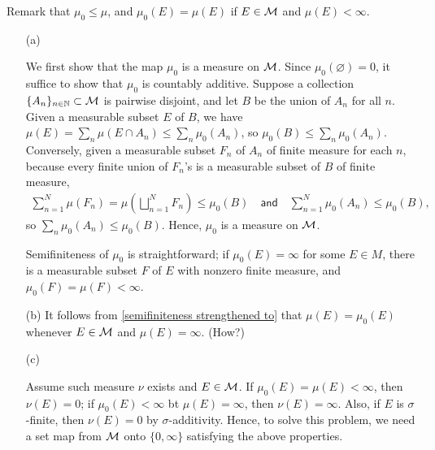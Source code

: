 \begin{sol}
    Remark that $\mu_0\leq\mu$, and $\mu_0(E)=\mu(E)$ if $E\in{\mathcal{M}}$ and $\mu(E)<\infty$.
    \begin{enumerate}
        \item[(a)]
        {
            We first show that the map $\mu_0$ is a measure on ${\mathcal{M}}$.
            Since $\mu_0(\varnothing)=0$, it suffice to show that $\mu_0$ is countably additive.
            Suppose a collection $\{A_n\}_{n\in{\mathbb{N}}}\subset{\mathcal{M}}$ is pairwise disjoint, and let $B$ be the union of $A_n$ for all $n$.
            Given a measurable subset $E$ of $B$, we have $\mu(E)=\sum_n\mu(E\cap A_n)\leq\sum_n\mu_0(A_n)$, so $\mu_0(B)\leq\sum_n\mu_0(A_n)$.
            Conversely, given a measurable subset $F_n$ of $A_n$ of finite measure for each $n$, because every finite union of $F_n$'s is a measurable subset of $B$ of finite measure,
            \begin{align*}
                \sum_{n=1}^N\mu(F_n)=\mu\left(\bigsqcup_{n=1}^N F_n\right)\leq\mu_0(B)
                \quad\textsf{and}\quad
                \sum_{n=1}^N\mu_0(A_n)\leq\mu_0(B),
            \end{align*}
            so $\sum_n\mu_0(A_n)\leq\mu_0(B)$.
            Hence, $\mu_0$ is a measure on ${\mathcal{M}}$.

            Semifiniteness of $\mu_0$ is straightforward; if $\mu_0(E)=\infty$ for some $E\in M$, there is a measurable subset $F$ of $E$ with nonzero finite measure, and $\mu_0(F)=\mu(F)<\infty$.
        }
        \item[(b)]
        {
            It follows from \cref{semifiniteness strengthened to} that $\mu(E)=\mu_0(E)$ whenever $E\in{\mathcal{M}}$ and $\mu(E)=\infty$. \color{brown}(How?)\color{black}
        }
        \item[(c)]
        {
            Assume such measure $\nu$ exists and $E\in{\mathcal{M}}$.
            If $\mu_0(E)=\mu(E)<\infty$, then $\nu(E)=0$; if $\mu_0(E)<\infty$ bt $\mu(E)=\infty$, then $\nu(E)=\infty$.
            Also, if $E$ is $\sigma$-finite, then $\nu(E)=0$ by $\sigma$-additivity.
            Hence, to solve this problem, we need a set map from ${\mathcal{M}}$ onto $\{0, \infty\}$ satisfying the above properties.

}
\end{enumerate}
\end{sol}
